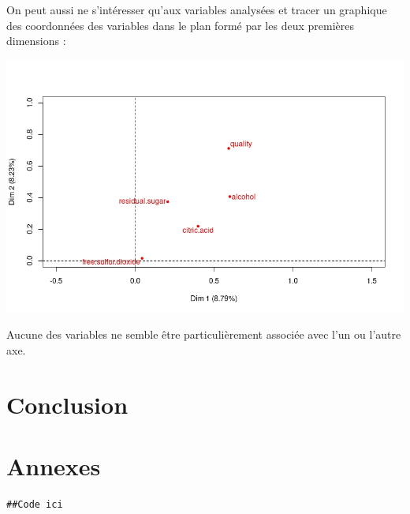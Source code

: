 \documentclass[11pt,a4paper]{article}
\begin{document}
On peut aussi ne s'intéresser qu'aux variables analysées et tracer un graphique des coordonnées des variables dans le plan formé par les deux premières dimensions :
\begin{center}
\includegraphics[scale=0.6]{"plot-var-mca"}
\end{center}
 Aucune des variables ne semble être particulièrement associée avec l'un ou l'autre axe.

\section{Conclusion}


\section{Annexes}

\lstset{language=R}
\begin{lstlisting}[breaklines]
##Code ici
\end{lstlisting}
\end{document}
